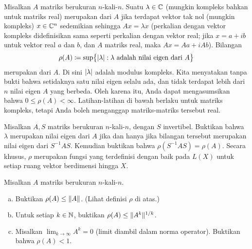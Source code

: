 \begin{exnote}
Misalkan $A$ matriks berukuran $n$-kali-$n$.
Suatu $\lambda \in {\mathbb{C}}$ (mungkin kompleks bahkan untuk matriks real)
merupakan \emph{} dari $A$
jika terdapat vektor tak nol (mungkin kompleks) $x \in {\mathbb{C}}^n$ sedemikian sehingga
$Ax = \lambda x$
(perkalian dengan vektor kompleks didefinisikan sama seperti perkalian dengan vektor real;
jika $x = a+ib$ untuk vektor real $a$ dan $b$, dan $A$ matriks real, maka $Ax = Aa + i Ab$).
Bilangan
\begin{equation*}
\rho(A) \coloneqq
\sup \bigl\{ \lvert {\lambda} \rvert : \lambda \text{ adalah nilai eigen dari } A \bigr\}
\end{equation*}
merupakan \emph{} dari $A$.  Di sini $\lvert {\lambda} \rvert$ adalah
modulus kompleks.  Kita menyatakan tanpa bukti bahwa setidaknya satu nilai eigen selalu ada,
dan tidak terdapat lebih dari $n$ nilai eigen $A$ yang berbeda.  Oleh karena itu, Anda dapat
mengasumsikan bahwa $0 \leq \rho(A) < \infty$.
Latihan-latihan di bawah berlaku untuk matriks kompleks, tetapi Anda boleh menganggap
matriks-matriks tersebut real.
\end{exnote}

\begin{exercise}
Misalkan $A,S$ matriks berukuran $n$-kali-$n$, dengan $S$ invertibel.
Buktikan bahwa $\lambda$ merupakan nilai eigen dari $A$ jika dan hanya
jika bilangan tersebut merupakan nilai eigen dari $S^{-1}AS$.  Kemudian buktikan bahwa
$\rho(S^{-1}AS) = \rho(A)$.
Secara khusus, $\rho$ merupakan fungsi yang terdefinisi dengan baik pada $L(X)$ untuk
setiap ruang vektor berdimensi hingga $X$.
\end{exercise}

\begin{exercise}
\pagebreak[2]
Misalkan $A$ matriks berukuran $n$-kali-$n$.
\begin{enumerate}[a)]
\item
Buktikan $\rho(A) \leq \lVert {A} \rVert$.  (Lihat definisi $\rho$ di atas.)
\item
Untuk setiap $k \in {\mathbb{N}}$, buktikan
$\rho(A) \leq \lVert {A^k} \rVert^{1/k}$.
\item
Misalkan $\displaystyle \lim_{k\to\infty} A^k = 0$ (limit diambil dalam norma operator).
Buktikan bahwa $\rho(A) < 1$.
\end{enumerate}
\end{exercise}

